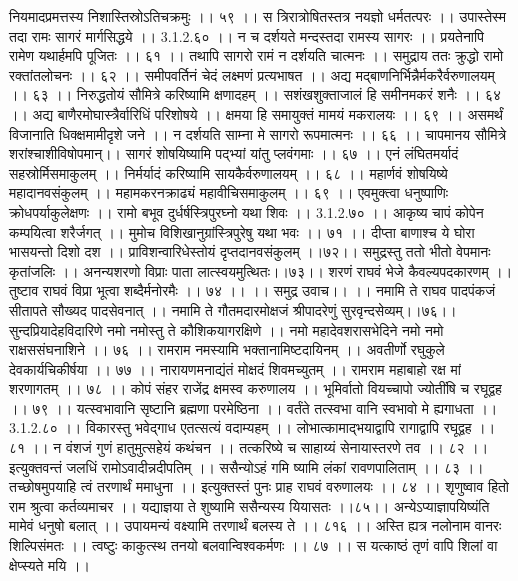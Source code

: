 नियमादप्रमत्तस्य निशास्तिस्रोऽतिचक्रमुः ।। ५९ ।।
स त्रिरात्रोषितस्तत्र नयज्ञो धर्मतत्परः ।।
उपास्तेस्म तदा रामः सागरं मार्गसिद्धये ।। 3.1.2.६० ।।
न च दर्शयते मन्दस्तदा रामस्य सागरः ।।
प्रयतेनापि रामेण यथार्हमपि पूजितः ।। ६१ ।।
तथापि सागरो रामं न दर्शयति चात्मनः ।।
समुद्राय ततः क्रुद्धो रामो रक्तांतलोचनः ।। ६२ ।।
समीपवर्तिनं चेदं लक्ष्मणं प्रत्यभाषत ।।
अद्य मद्बाणनिर्भिन्नैर्मकरैर्वरुणालयम् ।। ६३ ।।
निरुद्धतोयं सौमित्रे करिष्यामि क्षणादहम् ।।
सशंखशुक्ताजालं हि समीनमकरं शनैः ।। ६४ ।।
अद्य बाणैरमोघास्त्रैर्वारिधिं परिशोषये ।।
क्षमया हि समायुक्तं मामयं मकरालयः ।। ६९ ।।
असमर्थं विजानाति धिक्क्षमामीदृशे जने ।।
न दर्शयति साम्ना मे सागरो रूपमात्मनः ।। ६६ ।।
चापमानय सौमित्रे शरांश्चाशीविषोपमान्।।
सागरं शोषयिष्यामि पद्भ्यां यांतु प्लवंगमाः ।। ६७ ।।
एनं लंघितमर्यादं सहस्रोर्मिसमाकुलम् ।।
निर्मर्यादं करिष्यामि सायकैर्वरुणालयम् ।। ६८ ।।
महार्णवं शोषयिष्ये महादानवसंकुलम् ।।
महामकरनक्राढ्यं महावीचिसमाकुलम् ।। ६९ ।।
एवमुक्त्वा धनुष्पाणिः क्रोधपर्याकुलेक्षणः ।।
रामो बभूव दुर्धर्षस्त्रिपुरघ्नो यथा शिवः ।। 3.1.2.७० ।।
आकृष्य चापं कोपेन कम्पयित्वा शरैर्जगत् ।।
मुमोच विशिखानुग्रांस्त्रिपुरेषु यथा भवः ।। ७१ ।।
दीप्ता बाणाश्च ये घोरा भासयन्तो दिशो दश ।।
प्राविशन्वारिधेस्तोयं दृप्तदानवसंकुलम् ।।७२।।
समुद्रस्तु ततो भीतो वेपमानः कृतांजलिः ।।
अनन्यशरणो विप्राः पाता लात्स्वयमुत्थितः।।७३।।
शरणं राघवं भेजे कैवल्यपदकारणम् ।।
तुष्टाव राघवं विप्रा भूत्वा शब्दैर्मनोरमैः ।। ७४ ।।
।। समुद्र उवाच।। ।।
नमामि ते राघव पादपंकजं सीतापते सौख्यद पादसेवनात् ।।
नमामि ते गौतमदारमोक्षजं श्रीपादरेणुं सुरवृन्दसेव्यम्।।७६।।
सुन्दप्रियादेहविदारिणे नमो नमोस्तु ते कौशिकयागरक्षिणे ।।
नमो महादेवशरासभेदिने नमो नमो राक्षससंघनाशिने ।। ७६ ।।
रामराम नमस्यामि भक्तानामिष्टदायिनम् ।।
अवतीर्णो रघुकुले देवकार्यचिकीर्षया ।। ७७ ।।
नारायणमनाद्यंतं मोक्षदं शिवमच्युतम् ।।
रामराम महाबाहो रक्ष मां शरणागतम् ।। ७८ ।।
कोपं संहर राजेंद्र क्षमस्व करुणालय ।।
भूमिर्वातो वियच्चापो ज्योतींषि च रघूद्वह ।। ७९ ।।
यत्स्वभावानि सृष्टानि ब्रह्मणा परमेष्ठिना ।।
वर्तंते तत्स्वभा वानि स्वभावो मे ह्यगाधता ।। 3.1.2.८० ।।
विकारस्तु भवेद्गाध एतत्सत्यं वदाम्यहम् ।।
लोभात्कामाद्भयाद्वापि रागाद्वापि रघूद्वह ।। ८१ ।।
न वंशजं गुणं हातुमुत्सहेयं कथंचन ।।
तत्करिष्ये च साहाय्यं सेनायास्तरणे तव ।। ८२ ।।
इत्युक्तवन्तं जलधिं रामोऽवादीन्नदीपतिम् ।।
ससैन्योऽहं गमि ष्यामि लंकां रावणपालिताम् ।। ८३ ।।
तच्छोषमुपयाहि त्वं तरणार्थं ममाधुना ।।
इत्युक्तस्तं पुनः प्राह राघवं वरुणालयः ।। ८४ ।।
शृणुष्वाव हितो राम श्रुत्वा कर्तव्यमाचर ।।
यद्याज्ञया ते शुष्यामि ससैन्यस्य यियासतः ।।८५।।
अन्येऽप्याज्ञापयिष्यंति मामेवं धनुषो बलात् ।।
उपायमन्यं वक्ष्यामि तरणार्थं बलस्य ते ।। ८१६ ।।
अस्ति ह्यत्र नलोनाम वानरः शिल्पिसंमतः ।।
त्वष्टुः काकुत्स्थ तनयो बलवान्विश्वकर्मणः ।। ८७ ।।
स यत्काष्ठं तृणं वापि शिलां वा क्षेप्स्यते मयि ।।
